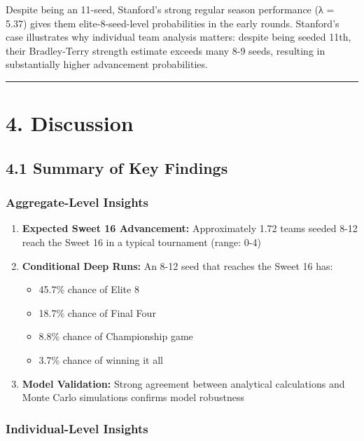 \documentclass[
]{article}
\providecommand{\tightlist}{%
  \setlength{\itemsep}{0pt}\setlength{\parskip}{0pt}}
\begin{document}
Despite being an 11-seed, Stanford's strong regular season performance
(λ = 5.37) gives them elite-8-seed-level probabilities in the early
rounds. Stanford's case illustrates why individual team analysis
matters: despite being seeded 11th, their Bradley-Terry strength
estimate exceeds many 8-9 seeds, resulting in substantially higher
advancement probabilities.

\begin{center}\rule{0.5\linewidth}{0.5pt}\end{center}

\section{4. Discussion}\label{discussion}

\subsection{4.1 Summary of Key Findings}\label{summary-of-key-findings}

\subsubsection{Aggregate-Level Insights}\label{aggregate-level-insights}

\begin{enumerate}
\def\labelenumi{\arabic{enumi}.}
\item
  \textbf{Expected Sweet 16 Advancement:} Approximately 1.72 teams
  seeded 8-12 reach the Sweet 16 in a typical tournament (range: 0-4)
\item
  \textbf{Conditional Deep Runs:} An 8-12 seed that reaches the Sweet 16
  has:

  \begin{itemize}
  \tightlist
  \item
    45.7\% chance of Elite 8
  \item
    18.7\% chance of Final Four
  \item
    8.8\% chance of Championship game
  \item
    3.7\% chance of winning it all
  \end{itemize}
\item
  \textbf{Model Validation:} Strong agreement between analytical
  calculations and Monte Carlo simulations confirms model robustness
\end{enumerate}

\subsubsection{Individual-Level
Insights}\label{individual-level-insights}
\end{document}
